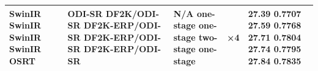 \begin{tabular}{lllll}
\toprule
SwinIR SwinIR SwinIR SwinIR OSRT & ODI-SR DF2K/ODI-SR DF2K-ERP/ODI-SR DF2K-ERP/ODI-SR DF2K-ERP/ODI-SR & N/A one-stage one-stage two-stage one-stage & ×4 & 27.39 0.7707 27.59 0.7768 27.71 0.7804 27.74 0.7795 27.84 0.7835 \\
\midrule
\bottomrule
\end{tabular}

